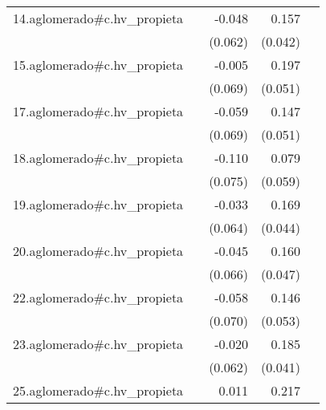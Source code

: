{\begin{longtable}{l*{4}{D{.}{.}{-1}}}
\addlinespace
14.aglomerado#c.hv\_propieta&                     &      -0.048         &       0.157\sym{***}&                     \\
            &                     &     (0.062)         &     (0.042)         &                     \\
\addlinespace
15.aglomerado#c.hv\_propieta&                     &      -0.005         &       0.197\sym{***}&                     \\
            &                     &     (0.069)         &     (0.051)         &                     \\
\addlinespace
17.aglomerado#c.hv\_propieta&                     &      -0.059         &       0.147\sym{**} &                     \\
            &                     &     (0.069)         &     (0.051)         &                     \\
\addlinespace
18.aglomerado#c.hv\_propieta&                     &      -0.110         &       0.079         &                     \\
            &                     &     (0.075)         &     (0.059)         &                     \\
\addlinespace
19.aglomerado#c.hv\_propieta&                     &      -0.033         &       0.169\sym{***}&                     \\
            &                     &     (0.064)         &     (0.044)         &                     \\
\addlinespace
20.aglomerado#c.hv\_propieta&                     &      -0.045         &       0.160\sym{***}&                     \\
            &                     &     (0.066)         &     (0.047)         &                     \\
\addlinespace
22.aglomerado#c.hv\_propieta&                     &      -0.058         &       0.146\sym{**} &                     \\
            &                     &     (0.070)         &     (0.053)         &                     \\
\addlinespace
23.aglomerado#c.hv\_propieta&                     &      -0.020         &       0.185\sym{***}&                     \\
            &                     &     (0.062)         &     (0.041)         &                     \\
\addlinespace
25.aglomerado#c.hv\_propieta&                     &       0.011         &       0.217\sym{***}&                     \\

\end{longtable}}
